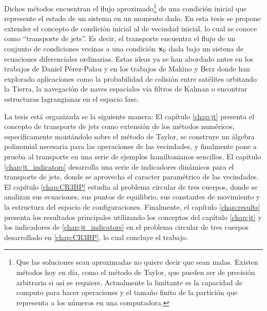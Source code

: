 Dichos métodos encuentran el flujo aproximado\footnote{Que las soluciones sean aproximadas no quiere decir que sean malas. Existen métodos hoy en día, como el método de Taylor, que pueden ser de precisión arbitraria si así se requiere. Actualmente la limitante es la capacidad de computo para hacer operaciones y el tamaño finito de la partición que representa a los números en una computadora.} de una condición inicial que represente el estado de un sistema en un momento dado. En esta tesis se propone extender el concepto de condición inicial al de vecindad inicial, lo cual se conoce como ``transporte de jets''. Es decir, el transporte encuentra el flujo de un conjunto de condiciones vecinas a una condición $\mathbf{x}_0$ dada bajo un sistena de ecuaciones diferenciales ordinarias. Estas ideas ya se han abordado antes en los trabajos de Daniel Pérez-Palau \cite{Daniel2015, Perez2013, Perez2015} y en los trabajos de Makino y Berz \cite{Berz1991,Berz1998} donde han explorado aplicaciones como la probabilidad de colisión entre satélites orbitando la Tierra, la navegación de naves espaciales via filtros de Kalman o  encontrar estructuras lagrangianas en el espacio fase.

La tesis está organizada se la siguiente manera: El capítulo \ref{chap:jt} presenta el concepto de transporte de jets como extensión de los métodos numéricos, específicamente montándolo sobre el método de Taylor, se construye un álgebra polinomial necesaria para las operaciones de las vecindades, y finalmente pone a prueba al transporte en una serie de ejemplos hamiltonianos sencillos. El capítulo \ref{chap:jt_indicators} desarrolla una serie de indicadores dinámicos para el transporte de jets, donde se aprovecha el caracter paramétrico de las vecindades. El capítulo \ref{chap:CR3BP} estudia al problema circular de tres cuerpos, donde se analizan sus ecuaciones, sus puntos de equilibrio, sus constantes de movimiento y la estructura del espacio de configuraciones. Finalmente, el capítulo \ref{chap:results} presenta los resultados principales utilizando los conceptos del capítulo \ref{chap:jt} y los indicadores de \ref{chap:jt_indicators} en el problema circular de tres cuerpos desarrollado en \ref{chap:CR3BP}, lo cual concluye el trabajo. 


